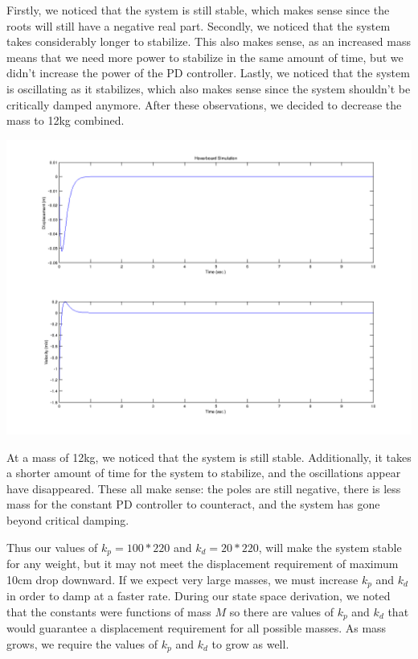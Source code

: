 \documentclass[titlepage]{article}
\begin{document}
Firstly, we noticed that the system is still stable, which makes sense since the roots will still have a
negative real part. Secondly, we noticed that the system takes considerably longer to stabilize. This also makes sense, as an increased mass means that we need more power to stabilize in the same amount of time, but we didn't increase the power of the PD controller. Lastly, we noticed
that the system is oscillating as it stabilizes, which also makes sense since the system shouldn't be critically damped anymore. After these observations, we decided to decrease the mass to 12kg combined.

\includegraphics[scale=0.5]{mguy12k_p100120k_d20120.png}

At a mass of 12kg, we noticed that the system is still stable. Additionally, it takes a shorter amount of time for the system to stabilize, and the oscillations appear have disappeared. These all make sense: the poles are still negative, there is less mass for the constant PD controller to counteract, and the system has gone beyond critical damping.

Thus our values of $k_p = 100*220$ and $k_d = 20*220$,  will make the system stable for any weight, but it may not meet the displacement requirement of maximum 10cm drop downward. If we expect very large masses, we must increase $k_p$ and $k_d$ in order to damp at a faster rate. During our state space derivation, we noted that the constants were functions of mass $M$ so there are values of $k_p$ and $k_d$ that would guarantee a displacement requirement for all possible masses. As mass grows, we require the values of $k_p$ and $k_d$ to grow as well.
\end{document}
